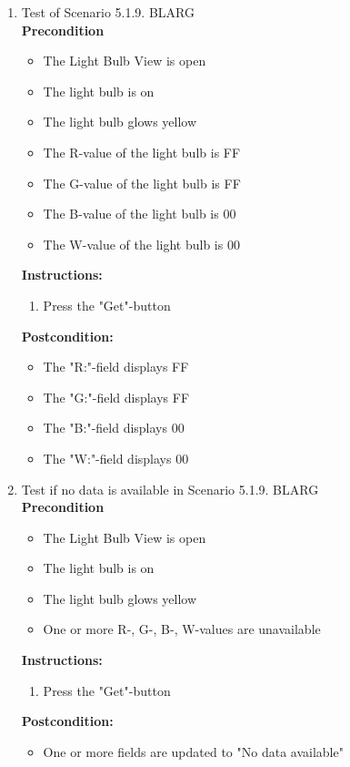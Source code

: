 \documentclass[a4paper]{article}
\newlength{\testlabellength}
\newenvironment{testlist}{\begin{enumerate}[label=\bfseries Instruction \thesubsection.\arabic* , labelindent=0pt, labelwidth=\testlabellength , leftmargin=2cm]}{\end{enumerate}}
\newenvironment{precondition}{
{\color{white}BLARG}\\ 
\textbf{Precondition}
\begin{itemize}[labelindent=0cm, labelwidth=2cm , leftmargin=1cm]
}
{\end{itemize}}
\newenvironment{instruction}{
\textbf{Instructions:}
\begin{enumerate}[label=\bfseries  \arabic*., labelindent=0cm, labelwidth=2cm , leftmargin=1cm]
}
{\end{enumerate}}
\newenvironment{postcondition}{
\textbf{Postcondition:}
\begin{itemize}[labelindent=0cm, labelwidth=2cm , leftmargin=1cm]
}
{\end{itemize}}
\begin{document}
\begin{appendices}
\begin{testlist}
	\item  Test of Scenario 5.1.9.
		\begin{precondition}
			\item The Light Bulb View is open
			\item The light bulb is on
			\item The light bulb glows yellow
			\item The R-value of the light bulb is FF
			\item The G-value of the light bulb is FF
			\item The B-value of the light bulb is 00
			\item The W-value of the light bulb is 00
		\end{precondition}
		\begin{instruction}
			\item Press the "Get"-button
		\end{instruction}
		\begin{postcondition}
			\item The "R:"-field displays FF
			\item The "G:"-field displays FF
			\item The "B:"-field displays 00
			\item The "W:"-field displays 00
		\end{postcondition}
\newpage
	\item  Test if no data is available in Scenario 5.1.9.
		\begin{precondition}
			\item The Light Bulb View is open
			\item The light bulb is on
			\item The light bulb glows yellow
			\item One or more R-, G-, B-, W-values are unavailable
		\end{precondition}
		\begin{instruction}
			\item Press the "Get"-button
		\end{instruction}
		\begin{postcondition}
			\item One or more fields are updated to "No data available"
		\end{postcondition}


\end{testlist}
\end{appendices}
\end{document}
